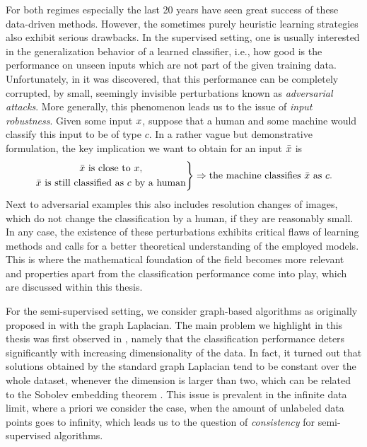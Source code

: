 For both regimes especially the last 20 years have seen great success of these data-driven methods. However, the sometimes purely heuristic learning strategies also exhibit serious drawbacks. In the supervised setting, one is usually interested in the generalization behavior of a learned classifier, i.e., how good is the performance on unseen inputs which are not part of the given training data. Unfortunately, in \cite{goodfellow2014explaining} it was discovered, that this performance can be completely corrupted, by small, seemingly invisible perturbations known as \textit{adversarial attacks}. More generally, this phenomenon leads us to the issue of \textit{input robustness}. Given some input $x$, suppose that a human and some machine would classify this input to be of type $c$. In a rather vague but demonstrative formulation, the key implication we want to obtain for an input $\bar{x}$ is
%
\begin{align*}
\left.
\begin{gathered}
\bar{x}\text{ is close to }x,\\
\bar{x}\text{ is still classified as }c\text{ by a human}
\end{gathered}
\right\}
\Rightarrow
\text{the machine classifies }\bar{x}\text{ as } c. 
\end{align*}
%
Next to adversarial examples this also includes resolution changes of images, which do not change the classification by a human, if they are reasonably small. In any case, the existence of these perturbations exhibits critical flaws of learning methods and calls for a better theoretical understanding of the employed models. This is where the mathematical foundation of the field becomes more relevant and properties apart from the classification performance come into play, which are discussed within this thesis.

For the semi-supervised setting, we consider graph-based algorithms as originally proposed in \cite{zhu2003semi} with the graph Laplacian. The main problem we highlight in this thesis was first observed in \cite{nadler2009statistical}, namely that the classification performance deters significantly with increasing dimensionality of the data. In fact, it turned out that solutions obtained by the standard graph Laplacian tend to be constant over the whole dataset, whenever the dimension is larger than two, which can be related to the Sobolev embedding theorem \cite{adams2003sobolev}. This issue is prevalent in the infinite data limit, where a priori we consider the case, when the amount of unlabeled data points goes to infinity, which leads us to the question of \textit{consistency} for semi-supervised algorithms.

